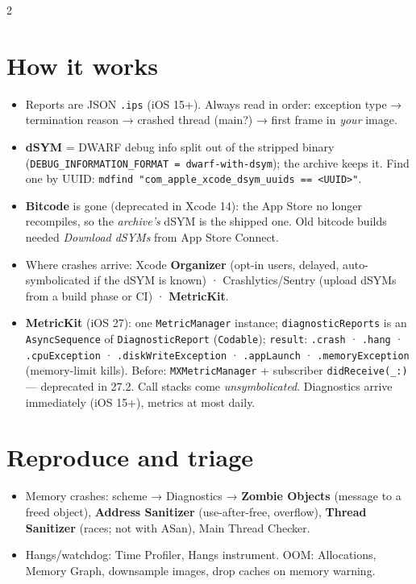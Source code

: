 \documentclass[8pt]{extarticle}
\begin{document}
\begin{multicols}{2}
\section{How it works}
\begin{itemize}
  \item Reports are JSON \texttt{.ips} (iOS 15+). Always read in order: exception type →
        termination reason → crashed thread (main?) → first frame in \emph{your} image.
  \item \textbf{dSYM} = DWARF debug info split out of the stripped binary
        (\texttt{DEBUG\_INFORMATION\_FORMAT = dwarf-with-dsym}); the archive keeps it.
        Find one by UUID: \texttt{mdfind "com\_apple\_xcode\_dsym\_uuids == <UUID>"}.
  \item \textbf{Bitcode} is gone (deprecated in Xcode 14): the App Store no longer
        recompiles, so the \emph{archive's} dSYM is the shipped one. Old bitcode builds
        needed \emph{Download dSYMs} from App Store Connect.
  \item Where crashes arrive: Xcode \textbf{Organizer} (opt-in users, delayed,
        auto-symbolicated if the dSYM is known) · Crashlytics/Sentry (upload dSYMs from a
        build phase or CI) · \textbf{MetricKit}.
  \item \textbf{MetricKit} (iOS 27): one \texttt{MetricManager} instance;
        \texttt{diagnosticReports} is an \texttt{AsyncSequence} of \texttt{DiagnosticReport}
        (\texttt{Codable}); \texttt{result}: \texttt{.crash} · \texttt{.hang} ·
        \texttt{.cpuException} · \texttt{.diskWriteException} · \texttt{.appLaunch} ·
        \texttt{.memoryException} (memory-limit kills). Before: \texttt{MXMetricManager} +
        subscriber \texttt{didReceive(\_:)} — deprecated in 27.2. Call stacks come
        \emph{unsymbolicated}. Diagnostics arrive immediately (iOS 15+), metrics at most daily.
\end{itemize}

\section{Reproduce and triage}
\begin{itemize}
  \item Memory crashes: scheme → Diagnostics → \textbf{Zombie Objects} (message to a freed
        object), \textbf{Address Sanitizer} (use-after-free, overflow),
        \textbf{Thread Sanitizer} (races; not with ASan), Main Thread Checker.
  \item Hangs/watchdog: Time Profiler, Hangs instrument. OOM: Allocations, Memory Graph,
        downsample images, drop caches on memory warning.
\end{itemize}


\end{multicols}
\end{document}
